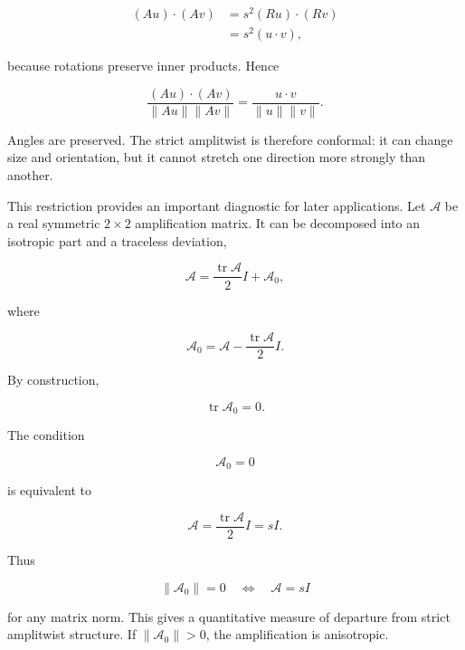 \documentclass[11pt]{article}
\begin{document}
\begin{align}
(Au)\cdot(Av)
&=
s^2(Ru)\cdot(Rv)\\
&=
s^2(u\cdot v),
\end{align}

because rotations preserve inner products. Hence

\begin{equation}
\frac{(Au)\cdot(Av)}
{\|Au\|\|Av\|}
=
\frac{u\cdot v}
{\|u\|\|v\|}.
\end{equation}

Angles are preserved. The strict amplitwist is therefore conformal: it can change size and orientation, but it cannot stretch one direction more strongly than another.

This restriction provides an important diagnostic for later applications. Let $\mathcal A$ be a real symmetric $2\times2$ amplification matrix. It can be decomposed into an isotropic part and a traceless deviation,

\begin{equation}
\mathcal A
=
\frac{\operatorname{tr}\mathcal A}{2}I
+
\mathcal A_0,
\end{equation}

where

\begin{equation}
\boxed{
\mathcal A_0
=
\mathcal A
-
\frac{\operatorname{tr}\mathcal A}{2}I
}.
\end{equation}

By construction,

\begin{equation}
\operatorname{tr}\mathcal A_0=0.
\end{equation}

The condition

\begin{equation}
\mathcal A_0=0
\end{equation}

is equivalent to

\begin{equation}
\mathcal A
=
\frac{\operatorname{tr}\mathcal A}{2}I
=
sI.
\end{equation}

Thus

\begin{equation}
\boxed{
\|\mathcal A_0\|=0
\quad\Longleftrightarrow\quad
\mathcal A=sI
}
\end{equation}

for any matrix norm. This gives a quantitative measure of departure from strict amplitwist structure. If $\|\mathcal A_0\|>0$, the amplification is anisotropic.
\end{document}
